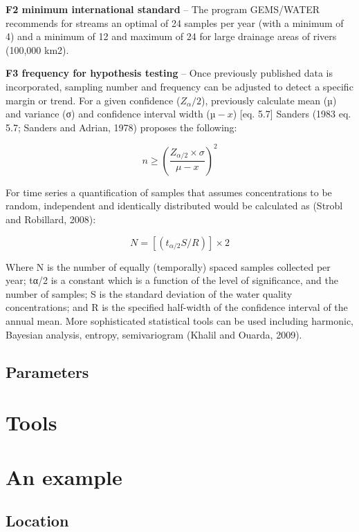 \documentclass[
]{book}
\begin{document}
\textbf{F2 minimum international standard} -- The program GEMS/WATER recommends for streams an optimal of 24 samples per year (with a minimum of 4) and a minimum of 12 and maximum of 24 for large drainage areas of rivers (100,000 km2).

\textbf{F3 frequency for hypothesis testing} -- Once previously published data is incorporated, sampling number and frequency can be adjusted to detect a specific margin or trend. For a given confidence (\(Z_α/2\)), previously calculate mean (µ) and variance (σ) and confidence interval width (\(µ-x\)) \citep{Sanders1983}{[}eq. 5.7{]} Sanders (1983 eq. 5.7; \citet{Sanders1978} Sanders and Adrian, 1978) proposes the following:

\[n≥\left(\frac{Z_{α/2}\times σ}{μ-x}\right)^2\]

For time series a quantification of samples that assumes concentrations to be random, independent and identically distributed would be calculated as (Strobl and Robillard, 2008):

\[N=[(t_{α/2} S / R)]\times2\]

Where N is the number of equally (temporally) spaced samples collected per year; tα/2 is a constant which is a function of the level of significance, and the number of samples; S is the standard deviation of the water quality concentrations; and R is the specified half-width of the confidence interval of the annual mean.
More sophisticated statistical tools can be used including harmonic, Bayesian analysis, entropy, semivariogram (Khalil and Ouarda, 2009).

\hypertarget{parameters}{%
\subsection{Parameters}\label{parameters}}

\hypertarget{tools-4}{%
\section{Tools}\label{tools-4}}

\hypertarget{an-example-3}{%
\section{An example}\label{an-example-3}}

\hypertarget{location-1}{%
\subsection{Location}\label{location-1}}
\end{document}
